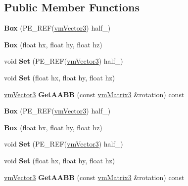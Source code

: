 \subsection*{Public Member Functions}
\begin{DoxyCompactItemize}
\item 
\mbox{\label{classBox_a8f606a53b630a558df77203b8ee28a6c}} 
{\bfseries Box} (P\+E\+\_\+\+R\+EF(\hyperlink{classVectormath_1_1Aos_1_1Vector3}{vm\+Vector3}) half\+\_\+)
\item 
\mbox{\label{classBox_a22a2eee699427db13ac222dfb41cc9f7}} 
{\bfseries Box} (float hx, float hy, float hz)
\item 
\mbox{\label{classBox_abb7f916da81c66b7a83f6d9640919796}} 
void {\bfseries Set} (P\+E\+\_\+\+R\+EF(\hyperlink{classVectormath_1_1Aos_1_1Vector3}{vm\+Vector3}) half\+\_\+)
\item 
\mbox{\label{classBox_abd360679ca42db8fe4870de4b354b155}} 
void {\bfseries Set} (float hx, float hy, float hz)
\item 
\mbox{\label{classBox_ae32f9da4ee69d5509fd657170573d7ca}} 
\hyperlink{classVectormath_1_1Aos_1_1Vector3}{vm\+Vector3} {\bfseries Get\+A\+A\+BB} (const \hyperlink{classVectormath_1_1Aos_1_1Matrix3}{vm\+Matrix3} \&rotation) const
\item 
\mbox{\label{classBox_a8f606a53b630a558df77203b8ee28a6c}} 
{\bfseries Box} (P\+E\+\_\+\+R\+EF(\hyperlink{classVectormath_1_1Aos_1_1Vector3}{vm\+Vector3}) half\+\_\+)
\item 
\mbox{\label{classBox_a22a2eee699427db13ac222dfb41cc9f7}} 
{\bfseries Box} (float hx, float hy, float hz)
\item 
\mbox{\label{classBox_abb7f916da81c66b7a83f6d9640919796}} 
void {\bfseries Set} (P\+E\+\_\+\+R\+EF(\hyperlink{classVectormath_1_1Aos_1_1Vector3}{vm\+Vector3}) half\+\_\+)
\item 
\mbox{\label{classBox_abd360679ca42db8fe4870de4b354b155}} 
void {\bfseries Set} (float hx, float hy, float hz)
\item 
\mbox{\label{classBox_ae32f9da4ee69d5509fd657170573d7ca}} 
\hyperlink{classVectormath_1_1Aos_1_1Vector3}{vm\+Vector3} {\bfseries Get\+A\+A\+BB} (const \hyperlink{classVectormath_1_1Aos_1_1Matrix3}{vm\+Matrix3} \&rotation) const
\end{DoxyCompactItemize}
